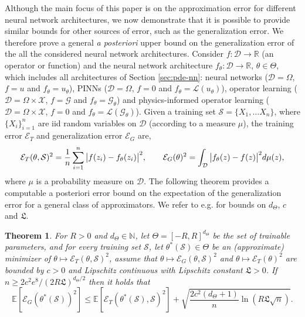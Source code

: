 \documentclass{article}
\numberwithin{equation}{section}
\newcommand{\R}{\mathbb{R}}
\newcommand{\N}{\mathbb{N}}
\renewcommand{\S}{\mathscr{S}}
\newcommand{\cD}{\mathcal{D}}
\newcommand{\cE}{\mathcal{E}}
\newcommand{\cG}{\mathcal{G}}
\newcommand{\cL}{\mathcal{L}}
\newcommand{\cX}{\mathcal{X}}
\newcommand{\1}{\mathbbm{1}}
\renewcommand{\S}{\mathcal{S}} %
\newcommand{\Et}{\mathcal{E}_T} %
\newcommand{\Eg}{\mathcal{E}_G} %
\newcommand{\E}[1]{{\mathbb{E}\left[ #1 \right]}} %
\newtheorem{theorem}{Theorem}[section]
\begin{document}
Although the main focus of this paper is on the approximation error for different neural network architectures, we now demonstrate that it is possible to provide similar bounds for other sources of error, such as the generalization error. We therefore prove a general \emph{a posteriori} upper bound on the generalization error of the all the considered neural network architectures. Consider $f:\cD\to\R$ (an operator or function) and the neural network architecture $f_\theta:\cD\to\R$, $\theta\in\Theta$, which includes all architectures of Section \ref{sec:pde-nn}: neural networks ($\cD = \Omega$, $f=u$ and $f_\theta = u_\theta$), PINNs ($\cD = \Omega$, $f=0$ and $f_\theta = \cL(u_\theta)$), operator learning ($\cD = \Omega\times \cX$, $f=\cG$ and $f_\theta = \cG_\theta$) and physics-informed operator learning ($\cD = \Omega\times \cX$, $f=0$ and $f_\theta = \cL(\cG_\theta)$). 
Given a training set $\S=\{X_1, \ldots X_n\}$, where $\{X_i\}_{i=1}^n$ are iid random variables on $\cD$ (according to a measure $\mu$), the training error $\Et$ and generalization error $\Eg$ are, 
\begin{equation}
    \cE_T(\theta, \S)^2 = \frac{1}{n}\sum_{i=1}^n \abs{f(z_i)-f_\theta(z_i)}^2, \qquad \cE_G(\theta)^2 = \int_\cD\abs{f_\theta(z)-f(z)}^2d\mu(z), 
\end{equation}
where $\mu$ is a probability measure on $\cD$. The following theorem provides a computable a posteriori error bound on the expectation of the generalization error for a general class of approximators. We refer to e.g. \cite{beck2020error, deryck2021pinn} for bounds on $d_\Theta$, $c$ and $\mathfrak{L}$.

\begin{theorem}\label{thm:generalization}
For $R>0$ and $d_\Theta\in\N$, let $\Theta = [-R,R]^{d_\Theta}$ be the set of trainable parameters, and for every training set $\S$, let $\theta^*(\S) \in\Theta$ be an (approximate) minimizer of $\theta\mapsto\Et(\theta,\S)^2$, assume that $\theta\mapsto\Eg(\theta,\S)^2$ and $\theta\mapsto\Et(\theta)^2$ are bounded by $c>0$ and Lipschitz continuous with Lipschitz constant $\mathfrak{L}>0$.  
If $n\geq 2c^2e^8/(2R\mathfrak{L})^{{d_\Theta}/2}$ then it holds that 
\begin{equation}\label{eq:generalization}
    \E{\cE_G(\theta^*(\S))^2} \leq \E{\cE_T(\theta^*(\S),\S)^2} + \sqrt{\frac{2c^2(d_\Theta+1)}{n}\ln(R\mathfrak{L}\sqrt{n})}.
\end{equation}
\end{theorem}
\end{document}
